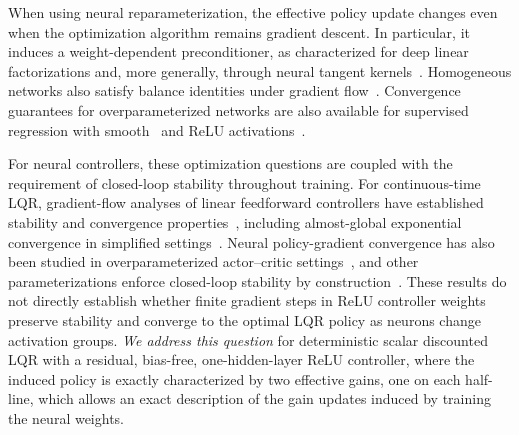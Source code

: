 \documentclass[letterpaper, 10 pt, conference]{ieeeconf}
\begin{document}
When using neural reparameterization, the effective policy update changes even when the optimization algorithm remains gradient descent. In particular, it induces a weight-dependent preconditioner, as characterized for deep linear factorizations and, more generally, through neural tangent kernels~\cite{arora2018optimization,jacot2018neural}. Homogeneous networks also satisfy balance identities under gradient flow~\cite{du2018algorithmic}. Convergence guarantees for overparameterized networks are also available for supervised regression with smooth~\cite{du2019gradient} and ReLU activations~\cite{du2019gradient_descent}.

For neural controllers, these optimization questions are coupled with the requirement of closed-loop stability throughout training. For continuous-time LQR, gradient-flow analyses of linear feedforward controllers have established stability and convergence properties~\cite{oliveira2025overparamlqr}, including almost-global exponential convergence in simplified settings~\cite{wafi2026almost}. Neural policy-gradient convergence has also been studied in overparameterized actor--critic settings~\cite{wang2020neuralpg}, and other parameterizations enforce closed-loop stability by construction~\cite{furieri2022neural}. These results do not directly establish whether finite gradient steps in ReLU controller weights preserve stability and converge to the optimal LQR policy as neurons change activation groups. \textit{We address this question} for deterministic scalar discounted LQR with a residual, bias-free, one-hidden-layer ReLU controller, where the induced policy is exactly characterized by two effective gains, one on each half-line, which allows an exact description of the gain updates induced by training the neural weights. 
\end{document}
